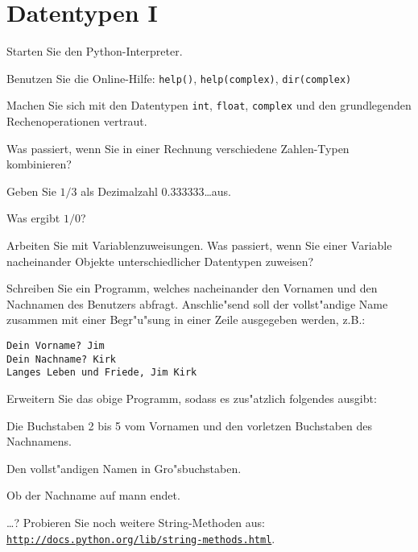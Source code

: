 \section*{Datentypen I}

\begin{aufgabe}
Starten Sie den Python-Interpreter.
\begin{auflistung}
\item Benutzen Sie die Online-Hilfe: \lstinline{help()}, \lstinline{help(complex)}, \lstinline{dir(complex)}
\item Machen Sie sich mit den Datentypen \texttt{int}, \texttt{float}, \texttt{complex} und den grundlegenden Rechenoperationen vertraut.
\item Was passiert, wenn Sie in einer Rechnung verschiedene Zahlen-Typen kombinieren?
\item Geben Sie $1/3$ als Dezimalzahl $0.333333$\dots aus.
\item Was ergibt $1/0$?
\item Arbeiten Sie mit Variablenzuweisungen. Was passiert, wenn Sie einer Variable nacheinander Objekte unterschiedlicher Datentypen zuweisen?
\end{auflistung}
\end{aufgabe}

\begin{aufgabe}[Strings]
\begin{teilaufgabe}
Schreiben Sie ein Programm, welches nacheinander den Vornamen und den Nachnamen des Benutzers abfragt. Anschlie"send soll der vollst"andige Name zusammen mit einer Begr"u"sung in einer Zeile ausgegeben werden, z.B.:
\begin{lstlisting}
Dein Vorname? Jim
Dein Nachname? Kirk
Langes Leben und Friede, Jim Kirk
\end{lstlisting}
\end{teilaufgabe}

\newpage

\begin{teilaufgabe}
Erweitern Sie das obige Programm, sodass es zus"atzlich folgendes ausgibt:
\begin{auflistung}
\item Die Buchstaben 2 bis 5 vom Vornamen und den vorletzen Buchstaben des Nachnamens.
\item Den vollst"andigen Namen in Gro"sbuchstaben.
\item Ob der Nachname auf \glqq mann\grqq{} endet.
\item \dots ? Probieren Sie noch weitere String-Methoden aus:\\ \texttt{\underline{http://docs.python.org/lib/string-methods.html}}.
\end{auflistung}
\end{teilaufgabe}
\end{aufgabe}

